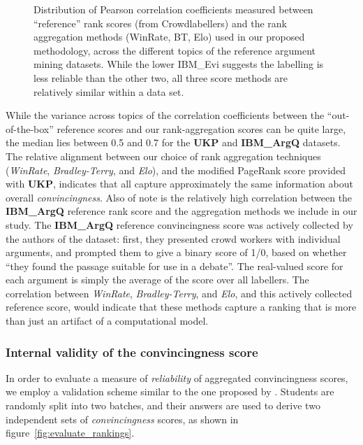 \documentclass[notitlepage,12pt]{jedm}
\begin{document}
\begin{figure}[H]
	\centering
	\scalebox{0.5}{}
	\caption{Distribution of Pearson correlation coefficients measured between 
		``reference'' rank scores (from Crowdlabellers) and the rank aggregation methods (WinRate, 
		BT, Elo) used in our proposed methodology, across the different topics 
		of the reference argument mining datasets.  While the lower IBM\_Evi suggests the labelling is less reliable than the other two, all three score methods are relatively similar within a data set.}  
	\label{fig:corr_to_reference_score}
\end{figure}

While the variance across topics of the correlation coefficients between the 
``out-of-the-box'' reference scores and our rank-aggregation scores can be 
quite large, the median lies between 0.5 and 0.7 for the \textbf{UKP} and 
\textbf{IBM\_ArgQ} datasets.
The relative alignment between our choice of rank aggregation techniques 
(\textit{WinRate}, \textit{Bradley-Terry}, and \textit{Elo}), and the modified 
PageRank score provided with \textbf{UKP}, indicates that all capture 
approximately the same information about overall \textit{convincingness}.
Also of note is the relatively high correlation between the \textbf{IBM\_ArgQ} 
reference rank score and the aggregation methods we include in our study. 
The \textbf{IBM\_ArgQ} reference convincingness score was actively collected by 
the authors of the dataset: first, they presented crowd workers with individual 
arguments, and prompted them to give a binary score of 1/0, based on whether 
``they found the passage suitable for use in a debate''. 
The real-valued score for each argument is simply the average of the score over 
all labellers.
The correlation between \textit{WinRate}, \textit{Bradley-Terry}, and 
\textit{Elo}, and this actively collected reference score, would indicate that 
these methods capture a ranking that is more than just an artifact of a 
computational model.
   
\subsubsection{Internal validity of the convincingness score}

In order to evaluate a measure of \textit{reliability} of aggregated 
convincingness scores, we employ a validation scheme similar to the one proposed by 
.
Students are randomly split into two batches, and their answers are used to 
derive two independent sets of \textit{convincingness} scores, as shown in 
figure~\ref{fig:evaluate_rankings}. 
\end{document}
